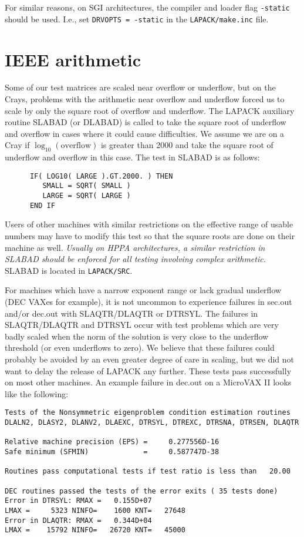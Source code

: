 \documentclass[11pt]{report}
\begin{document}
For similar reasons,
on SGI architectures, the compiler and loader flag \texttt{-static} should be
used.  I.e., set \texttt{DRVOPTS = -static} in the \texttt{LAPACK/make.inc} file.

\section{IEEE arithmetic}

Some of our test matrices are scaled near overflow or underflow,
but on the Crays, problems with the arithmetic near overflow and
underflow forced us to scale by only the square root of overflow
and underflow.
The LAPACK auxiliary routine SLABAD (or DLABAD) is called to
take the square root of underflow and overflow in cases where it
could cause difficulties.
We assume we are on a Cray if $ \log_{10} (\mathrm{overflow})$
is greater than 2000
and take the square root of underflow and overflow in this case.
The test in SLABAD is as follows:
\begin{verbatim}
      IF( LOG10( LARGE ).GT.2000. ) THEN
         SMALL = SQRT( SMALL )
         LARGE = SQRT( LARGE )
      END IF
\end{verbatim}
Users of other machines with similar restrictions on the effective
range of usable numbers may have to modify this test so that the
square roots are done on their machine as well.  \emph{Usually on
HPPA architectures, a similar restriction in SLABAD should be enforced
for all testing involving complex arithmetic.}
SLABAD is located in \texttt{LAPACK/SRC}.

For machines which have a narrow exponent range or lack gradual
underflow (DEC VAXes for example), it is not uncommon to experience
failures in sec.out and/or dec.out with SLAQTR/DLAQTR or DTRSYL.
The failures in SLAQTR/DLAQTR and DTRSYL
occur with test problems which are very badly scaled when the norm of
the solution is very close to the underflow
threshold (or even underflows to zero).  We believe that these failures
could probably be avoided by an even greater degree of care in scaling,
but we did not want to delay the release of LAPACK any further.  These
tests pass successfully on most other machines.  An example failure in
dec.out on a MicroVAX II looks like the following:

\begin{verbatim}
Tests of the Nonsymmetric eigenproblem condition estimation routines
DLALN2, DLASY2, DLANV2, DLAEXC, DTRSYL, DTREXC, DTRSNA, DTRSEN, DLAQTR

Relative machine precision (EPS) =     0.277556D-16
Safe minimum (SFMIN)             =     0.587747D-38

Routines pass computational tests if test ratio is less than   20.00

DEC routines passed the tests of the error exits ( 35 tests done)
Error in DTRSYL: RMAX =   0.155D+07
LMAX =     5323 NINFO=    1600 KNT=   27648
Error in DLAQTR: RMAX =   0.344D+04
LMAX =    15792 NINFO=   26720 KNT=   45000
\end{verbatim}
\end{document}

